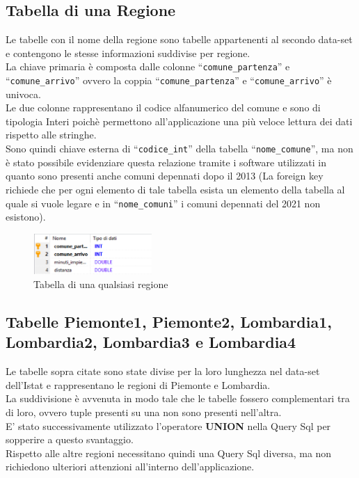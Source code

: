 \documentclass[a4paper,12pt]{report}
\begin{document}
\subsection{Tabella di una Regione}
Le tabelle con il nome della regione sono tabelle appartenenti al secondo data-set e contengono le
stesse informazioni suddivise per regione.\\
La chiave primaria è composta dalle colonne ``\texttt{comune\_partenza}'' e ``\texttt{comune\_arrivo}'' ovvero la coppia 
``\texttt{comune\_partenza}'' e ``\texttt{comune\_arrivo}'' è univoca.\\
Le due colonne rappresentano il codice alfanumerico del comune e sono di tipologia Interi  poichè permettono all'applicazione una più veloce lettura dei dati rispetto alle stringhe.\\
Sono quindi chiave esterna di ``\texttt{codice\_int}'' della tabella ``\texttt{nome\_comune}'', ma non è stato
possibile evidenziare questa relazione tramite i software utilizzati  in quanto sono presenti anche comuni depennati
dopo il 2013 (La foreign key richiede che per ogni elemento di tale tabella esista un elemento
della tabella al quale si vuole legare e in ``\texttt{nome\_comuni}'' i comuni depennati del 2021 non esistono).
\begin{figure}[h]
\begin{center}
\includegraphics[width=0.4\textwidth]{Images/tabellaRegione.png} 
\caption{Tabella di una qualsiasi regione}  
\end{center}
\end{figure}

\subsection{Tabelle Piemonte1, Piemonte2, Lombardia1, Lombardia2, Lombardia3 e Lombardia4}
Le tabelle sopra citate sono state divise per la loro lunghezza nel data-set dell'Istat e 
rappresentano le regioni di Piemonte e Lombardia.\\
La suddivisione è avvenuta in modo tale che le tabelle fossero complementari tra di loro, ovvero
tuple presenti su una non sono presenti nell'altra.\\
E' stato successivamente utilizzato l'operatore \textbf{UNION} nella Query Sql per sopperire a questo svantaggio.\\
Rispetto alle altre regioni necessitano quindi una Query Sql diversa, ma non richiedono ulteriori attenzioni all'interno dell'applicazione.
\end{document}
